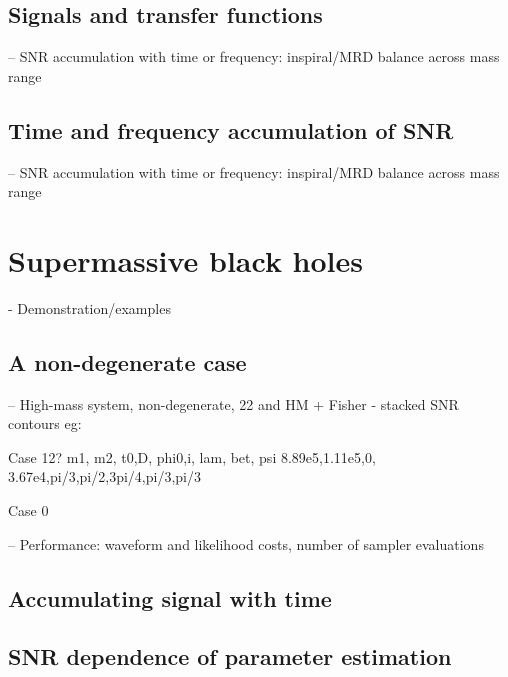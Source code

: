 \documentclass[aps,showpacs,twocolumn,prd,superscriptaddress,nofootinbib]{revtex4}
\begin{document}
\subsection{Signals and transfer functions}
\label{sec:signaltransfer}

-- SNR accumulation with time or frequency: inspiral/MRD balance across mass range


\subsection{Time and frequency accumulation of SNR}
\label{sec:timefreqSNR}

-- SNR accumulation with time or frequency: inspiral/MRD balance across mass range


\section{Supermassive black holes}
\label{sec:SMBH}

- Demonstration/examples


\subsection{A non-degenerate case}
\label{sec:SMBHPEnondeg}

-- High-mass system, non-degenerate, 22 and HM + Fisher - stacked SNR contours
eg:

Case 12?
m1,    m2,    t0,D,     phi0,i,   lam,  bet, psi
8.89e5,1.11e5,0, 3.67e4,pi/3,pi/2,3pi/4,pi/3,pi/3

Case 0

-- Performance: waveform and likelihood costs, number of sampler evaluations


\subsection{Accumulating signal with time}
\label{sec:SMBHPEacctime}


\subsection{SNR dependence of parameter estimation}
\label{sec:SMBHPEdistance}
\end{document}
